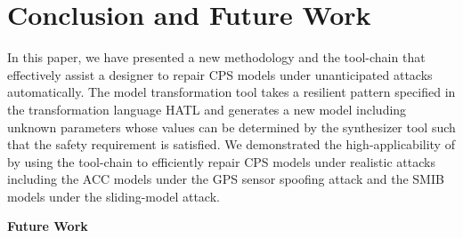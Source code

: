 \section{Conclusion and Future Work}
%
In this paper, we have presented a new methodology and the tool-chain \toolreaffirm that effectively assist a designer to repair CPS models under unanticipated attacks automatically. 
%
The model transformation tool takes a resilient pattern specified in the transformation language HATL and generates a new model including unknown parameters whose values can be determined by the synthesizer tool such that the safety requirement is satisfied.
%
We demonstrated the high-applicability of \toolreaffirm by using the tool-chain to efficiently repair CPS models under realistic attacks including the ACC models under the GPS sensor spoofing attack and the SMIB models under the sliding-model attack.

\vspace{0.5em}
\noindent
{\bf Future Work}

%
%
%
